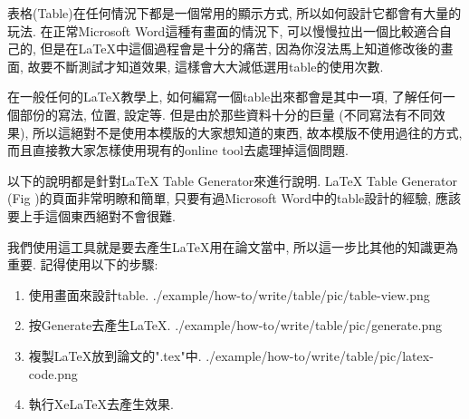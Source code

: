 
表格(Table)在任何情況下都是一個常用的顯示方式, 所以如何設計它都會有大量的玩法. 在正常Microsoft Word這種有畫面的情況下, 可以慢慢拉出一個比較適合自己的, 但是在LaTeX中這個過程會是十分的痛苦, 因為你沒法馬上知道修改後的畫面, 故要不斷測試才知道效果, 這樣會大大減低選用table的使用次數.

在一般任何的LaTeX教學上, 如何編寫一個table出來都會是其中一項, 了解任何一個部份的寫法, 位置, 設定等. 但是由於那些資料十分的巨量 (不同寫法有不同效果), 所以這絕對不是使用本模版的大家想知道的東西, 故本模版不使用過往的方式, 而且直接教大家怎樣使用現有的online tool去處理掉這個問題.

以下的說明都是針對LaTeX Table Generator來進行說明. LaTeX Table Generator (Fig )的頁面非常明瞭和簡單, 只要有過Microsoft Word中的table設計的經驗, 應該要上手這個東西絕對不會很難.


\newpage
{}

  我們使用這工具就是要去產生LaTeX用在論文當中, 所以這一步比其他的知識更為重要. 記得使用以下的步驟:

  \begin{enumerate}
  \item
  {
    使用畫面來設計table.
    \InsertFigure
      {./example/how-to/write/table/pic/table-view.png}
  } %

  \item
  {
    按Generate去產生LaTeX.
    \InsertFigure
      {./example/how-to/write/table/pic/generate.png}
  } %

  \item
  {
    複製LaTeX放到論文的".tex"中.
    \InsertFigure
      {./example/how-to/write/table/pic/latex-code.png}
  } %

  \item
  {
    執行XeLaTeX去產生效果.
  } %
  \end{enumerate}

